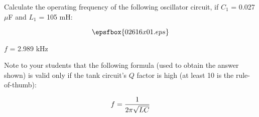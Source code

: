 

Calculate the operating frequency of the following oscillator circuit, if $C_1$ = 0.027 $\mu$F and $L_1$ = 105 mH:

$$\epsfbox{02616x01.eps}$$







$f$ = 2.989 kHz







Note to your students that the following formula (used to obtain the answer shown) is valid only if the tank circuit's $Q$ factor is high (at least 10 is the rule-of-thumb):

$$f = {1 \over {2 \pi \sqrt{LC}}}$$




